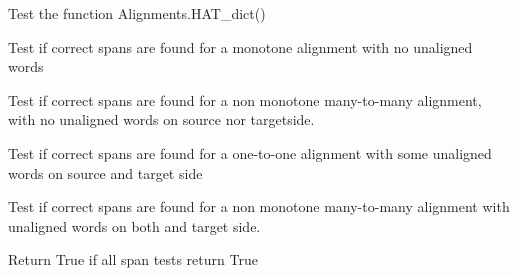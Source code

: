 \documentclass[letterpaper,10pt,english]{sphinxmanual}
\begin{document}
\begin{fulllineitems}

\begin{fulllineitems}
\label{tests:tests_alignments.AlignmentsTests.dict_test}
Test the function Alignments.HAT\_dict()

\end{fulllineitems}


\begin{fulllineitems}
\label{tests:tests_alignments.AlignmentsTests.span_test1}
Test if correct spans are found for
a monotone alignment with no unaligned words

\end{fulllineitems}


\begin{fulllineitems}
\label{tests:tests_alignments.AlignmentsTests.span_test2}
Test if correct spans are found for a non 
monotone many-to-many alignment, with no
unaligned words on source nor targetside.

\end{fulllineitems}


\begin{fulllineitems}
\label{tests:tests_alignments.AlignmentsTests.span_test3}
Test if correct spans are found for a 
one-to-one alignment with some
unaligned words on source and target side

\end{fulllineitems}


\begin{fulllineitems}
\label{tests:tests_alignments.AlignmentsTests.span_test4}
Test if correct spans are found for 
a non monotone many-to-many alignment with
unaligned words on both and target side.

\end{fulllineitems}


\begin{fulllineitems}
\label{tests:tests_alignments.AlignmentsTests.spans_test_all}
Return True if all span tests return True

\end{fulllineitems}


\end{fulllineitems}
\end{document}
